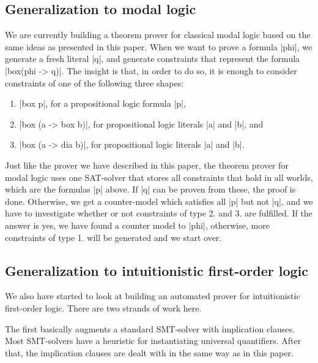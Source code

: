 \documentclass{llncs}
\begin{document}
\subsection{Generalization to modal logic}

We are currently building a theorem prover for classical modal logic based on the same ideas as presented in this paper. When we want to prove a formula |phi|, we generate a fresh literal |q|, and generate constraints that represent the formula |box(phi -> q)|. The insight is that, in order to do so, it is enough to consider constraints of one of the following three shapes:
\begin{enumerate}
\item |box p|, for a propositional logic formula |p|,
\item |box (a -> box b)|, for propositional logic literals |a| and |b|, and
\item |box (a -> dia b)|, for propositional logic literals |a| and |b|.
\end{enumerate}
Just like the prover we have described in this paper, the theorem prover for modal
logic uses one SAT-solver that stores all constraints that hold in all worlds, which are the formulas |p| above. If |q| can be proven from these, the proof is done. Otherwise, we get a counter-model which satisfies all |p| but not |q|, and we have to investigate whether or not constraints of type 2. and 3. are fulfilled. If the answer is yes, we have found a counter model to |phi|, otherwise, more constraints of type 1. will be generated and we start over.

\subsection{Generalization to intuitionistic first-order logic}

We also have started to look at building an automated prover for intuitionistic first-order logic. There are two strands of work here.

The first basically augments a standard SMT-solver with implication clauses. Most SMT-solvers have a heuristic for instantiating universal quantifiers. After that, the implication clauses are dealt with in the same way as in this paper.
\end{document}
